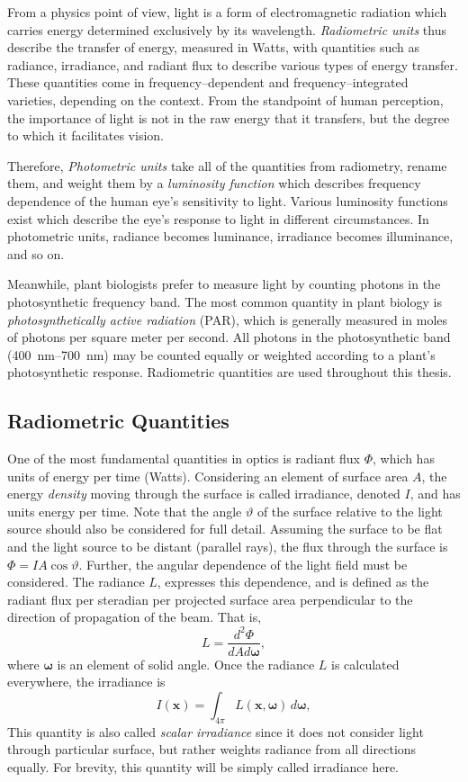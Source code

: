 \documentclass[ms,cpyr,lof,lot]{uathesis}
\renewcommand\vec\bm
\begin{document}
From a physics point of view, light is a form of electromagnetic radiation which carries energy determined exclusively by its wavelength.
\textit{Radiometric units} thus describe the transfer of energy, measured in Watts, with quantities such as radiance, irradiance, and radiant flux to describe various types of energy transfer.
These quantities come in frequency--dependent and frequency--integrated varieties, depending on the context.
From the standpoint of human perception, the importance of light is not in the raw energy that it transfers, but the degree to which it facilitates vision.

Therefore, \textit{Photometric units} take all of the quantities from radiometry, rename them, and weight them by a \textit{luminosity function} which describes frequency dependence of the human eye's sensitivity to light.
Various luminosity functions exist which describe the eye's response to light in different circumstances.
In photometric units, radiance becomes luminance, irradiance becomes illuminance, and so on.

Meanwhile, plant biologists prefer to measure light by counting photons in the photosynthetic frequency band.
The most common quantity in plant biology is \textit{photosynthetically active radiation} (PAR), which is generally measured in moles of photons per square meter per second.
All photons in the photosynthetic band (\SI{400}{\nm}--\SI{700}{\nm}) may be counted equally or weighted according to a plant's photosynthetic response.
Radiometric quantities are used throughout this thesis.

\subsection{Radiometric Quantities}
One of the most fundamental quantities in optics is radiant flux $\Phi$, which has units of energy per time (Watts).
Considering an element of surface area $A$, the energy \textit{density} moving through the surface is called irradiance, denoted $I$, and has units energy per time.
Note that the angle $\vartheta$ of the surface relative to the light source should also be considered for full detail. Assuming the surface to be flat and the light source to be distant (parallel rays), the flux through the surface is $\Phi=IA\cos\vartheta$.
Further, the angular dependence of the light field must be considered.
The radiance $L$, expresses this dependence, and is defined as the radiant flux per steradian per projected surface area perpendicular to the direction of propagation of the beam.
That is,
\begin{equation*}
	L = \frac{d^2\Phi}{dA d\vec{\omega}},
\end{equation*}
where $\vec{\omega}$ is an element of solid angle.
Once the radiance $L$ is calculated everywhere, the irradiance is
\begin{equation*}
  I(\vec{x}) = \int_{4\pi}L(\vec{x},\vec{\omega})\, d\vec{\omega},
\end{equation*}
This quantity is also called \textit{scalar irradiance} since it does not consider light through particular surface, but rather weights radiance from all directions equally.
For brevity, this quantity will be simply called irradiance here.
\end{document}
